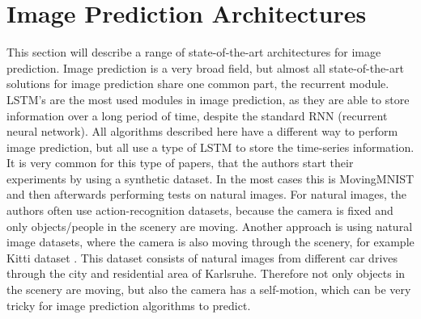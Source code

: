 \section{Image Prediction Architectures} \label{section::related}
 This section will describe a range of state-of-the-art architectures for image prediction. Image prediction is a very broad field, but almost all state-of-the-art solutions
 for image prediction share one common part, the recurrent module. LSTM's are the most used modules in image prediction, as they are able to store information over a long period of time, despite
 the standard RNN (recurrent neural network). All algorithms described here have a different way to perform image prediction, but all use a type of LSTM to store the time-series information.
 It is very common for this type of papers, that the authors start their experiments by using a synthetic dataset. In the most cases this is MovingMNIST \cite{LeCun1998} and then afterwards performing
 tests on natural images. For natural images, the authors often use action-recognition datasets, because the camera is fixed and only objects/people in the scenery are moving. Another approach
 is using natural image datasets, where the camera is also moving through the scenery, for example Kitti dataset \cite{Geiger2013}. This dataset consists of natural images from different car
 drives through the city and residential area of Karlsruhe. Therefore not only objects in the scenery are moving, but also the camera has a self-motion, which can be very tricky for image prediction
 algorithms to predict.
 
